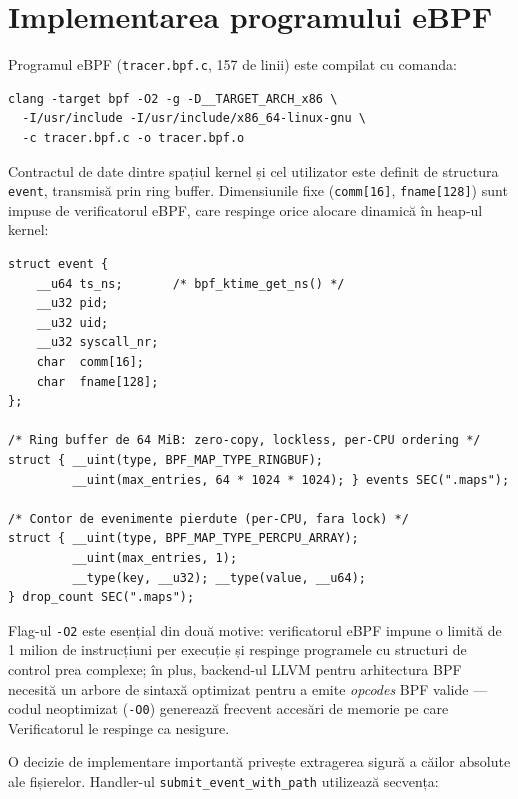 \section{Implementarea programului eBPF}
\label{sec:ebpf_impl}

\par Programul eBPF (\texttt{tracer.bpf.c}, 157 de linii) este compilat cu comanda:

\begin{verbatim}
clang -target bpf -O2 -g -D__TARGET_ARCH_x86 \
  -I/usr/include -I/usr/include/x86_64-linux-gnu \
  -c tracer.bpf.c -o tracer.bpf.o
\end{verbatim}

\par Contractul de date dintre spațiul kernel și cel utilizator este definit de structura \texttt{event}, transmisă prin ring buffer. Dimensiunile fixe (\texttt{comm[16]}, \texttt{fname[128]}) sunt impuse de verificatorul eBPF, care respinge orice alocare dinamică în heap-ul kernel:

\begin{lstlisting}[style=cstyle,caption={Structura evenimentului și hărțile eBPF din \texttt{tracer.bpf.c}}]
struct event {
    __u64 ts_ns;       /* bpf_ktime_get_ns() */
    __u32 pid;
    __u32 uid;
    __u32 syscall_nr;
    char  comm[16];
    char  fname[128];
};

/* Ring buffer de 64 MiB: zero-copy, lockless, per-CPU ordering */
struct { __uint(type, BPF_MAP_TYPE_RINGBUF);
         __uint(max_entries, 64 * 1024 * 1024); } events SEC(".maps");

/* Contor de evenimente pierdute (per-CPU, fara lock) */
struct { __uint(type, BPF_MAP_TYPE_PERCPU_ARRAY);
         __uint(max_entries, 1);
         __type(key, __u32); __type(value, __u64);
} drop_count SEC(".maps");
\end{lstlisting}

\par Flag-ul \texttt{-O2} este esențial din două motive: verificatorul eBPF impune o limită de 1 milion de instrucțiuni per execuție și respinge programele cu structuri de control prea complexe; în plus, backend-ul LLVM pentru arhitectura BPF necesită un arbore de sintaxă optimizat pentru a emite \textit{opcodes} BPF valide --- codul neoptimizat (\texttt{-O0}) generează frecvent accesări de memorie pe care Verificatorul le respinge ca nesigure.

\par O decizie de implementare importantă privește extragerea sigură a căilor absolute ale fișierelor. Handler-ul \texttt{submit\_event\_with\_path} utilizează secvența:


